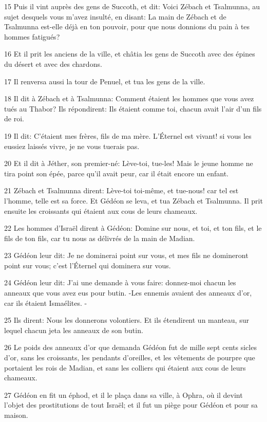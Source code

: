 \par 15 Puis il vint auprès des gens de Succoth, et dit: Voici Zébach et Tsalmunna, au sujet desquels vous m'avez insulté, en disant: La main de Zébach et de Tsalmunna est-elle déjà en ton pouvoir, pour que nous donnions du pain à tes hommes fatigués?
\par 16 Et il prit les anciens de la ville, et châtia les gens de Succoth avec des épines du désert et avec des chardons.
\par 17 Il renversa aussi la tour de Penuel, et tua les gens de la ville.
\par 18 Il dit à Zébach et à Tsalmunna: Comment étaient les hommes que vous avez tués au Thabor? Ils répondirent: Ils étaient comme toi, chacun avait l'air d'un fils de roi.
\par 19 Il dit: C'étaient mes frères, fils de ma mère. L'Éternel est vivant! si vous les eussiez laissés vivre, je ne vous tuerais pas.
\par 20 Et il dit à Jéther, son premier-né: Lève-toi, tue-les! Mais le jeune homme ne tira point son épée, parce qu'il avait peur, car il était encore un enfant.
\par 21 Zébach et Tsalmunna dirent: Lève-toi toi-même, et tue-nous! car tel est l'homme, telle est sa force. Et Gédéon se leva, et tua Zébach et Tsalmunna. Il prit ensuite les croissants qui étaient aux cous de leurs chameaux.
\par 22 Les hommes d'Israël dirent à Gédéon: Domine sur nous, et toi, et ton fils, et le fils de ton fils, car tu nous as délivrés de la main de Madian.
\par 23 Gédéon leur dit: Je ne dominerai point sur vous, et mes fils ne domineront point sur vous; c'est l'Éternel qui dominera sur vous.
\par 24 Gédéon leur dit: J'ai une demande à vous faire: donnez-moi chacun les anneaux que vous avez eus pour butin. -Les ennemis avaient des anneaux d'or, car ils étaient Ismaélites. -
\par 25 Ils dirent: Nous les donnerons volontiers. Et ils étendirent un manteau, sur lequel chacun jeta les anneaux de son butin.
\par 26 Le poids des anneaux d'or que demanda Gédéon fut de mille sept cents sicles d'or, sans les croissants, les pendants d'oreilles, et les vêtements de pourpre que portaient les rois de Madian, et sans les colliers qui étaient aux cous de leurs chameaux.
\par 27 Gédéon en fit un éphod, et il le plaça dans sa ville, à Ophra, où il devint l'objet des prostitutions de tout Israël; et il fut un piège pour Gédéon et pour sa maison.
